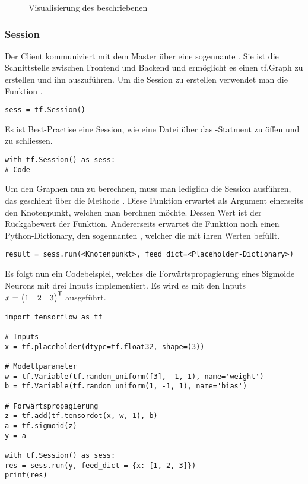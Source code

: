 \begin{figure}
  \caption{Visualisierung des beschriebenen }
\end{figure}
\para{}


\subsubsection{Session}
Der Client kommuniziert mit dem Master über eine sogennante
.
Sie ist die Schnittstelle zwischen Frontend und Backend und ermöglicht es einen tf.Graph
zu erstellen und ihn auszuführen.
Um die Session zu erstellen verwendet man die Funktion .
\begin{verbatim}
sess = tf.Session()
\end{verbatim}
Es ist Best-Practise eine Session, wie eine Datei über das
-Statment zu öffen und zu schliessen.
\begin{verbatim}
with tf.Session() as sess:
# Code
\end{verbatim}
\para{}
Um den Graphen nun zu berechnen, muss man lediglich die Session ausführen, das
geschieht über die Methode .
Diese Funktion erwartet als Argument einerseits den Knotenpunkt, welchen man
berchnen möchte. Dessen Wert ist der Rückgabewert der Funktion.
Andererseits erwartet die Funktion noch einen Python-Dictionary, den sogennanten
, welcher die  mit ihren Werten befüllt.
\begin{verbatim}
result = sess.run(<Knotenpunkt>, feed_dict=<Placeholder-Dictionary>)
\end{verbatim}
Es folgt nun ein Codebeispiel, welches die Forwärtspropagierung eines
Sigmoide Neurons mit drei Inputs implementiert. Es wird es mit den Inputs $x = \begin{pmatrix}1&2&3\end{pmatrix}^{\mathsf{T}}$ ausgeführt.
\begin{verbatim}
import tensorflow as tf

# Inputs
x = tf.placeholder(dtype=tf.float32, shape=(3))

# Modellparameter
w = tf.Variable(tf.random_uniform([3], -1, 1), name='weight')
b = tf.Variable(tf.random_uniform(1, -1, 1), name='bias')

# Forwärtspropagierung
z = tf.add(tf.tensordot(x, w, 1), b)
a = tf.sigmoid(z)
y = a

with tf.Session() as sess:
res = sess.run(y, feed_dict = {x: [1, 2, 3]})
print(res)
\end{verbatim}

